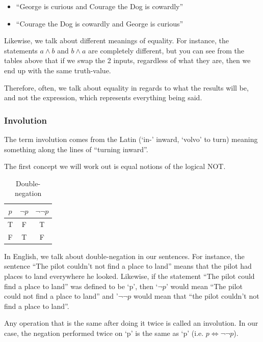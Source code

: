 \begin{itemize}
    \item ``George is curious and Courage the Dog is cowardly''
    \item ``Courage the Dog is cowardly and George is curious''
\end{itemize}

Likewise, we talk about different meanings of equality. For instance, the statements $a \wedge b$ and $b \wedge a$ are completely different, but you can see from the tables above that if we swap the 2 inputs, regardless of what they are, then we end up with the same truth-value.

Therefore, often, we talk about equality in regards to what the results will be, and not the expression, which represents everything being said.

\subsubsection{Involution}
The term involution comes from the Latin (`in-' inward, `volvo' to turn) meaning something along the lines of ``turning inward''. 

The first concept we will work out is equal notions of the logical NOT.

\begin{table}[]
    \centering
    \begin{tabular}{|c|c|c|} \hline
         $p$ & $\neg p$ & $\neg \neg p$ \\ \hline
         T & F & T \\ \hline
         F & T & F \\ \hline
    \end{tabular}
    \caption{Double-negation}
    \label{tab:my_label}
\end{table}

In English, we talk about double-negation in our sentences. For instance, the sentence ``The pilot couldn't not find a place to land'' means that the pilot had places to land everywhere he looked. Likewise, if the statement ``The pilot could find a place to land'' was defined to be `p', then `$\neg p$' would mean ``The pilot could not find a place to land'' and '$\neg \neg p$ would mean that ``the pilot couldn't not find a place to land''.

Any operation that is the same after doing it twice is called an \gls{involution}. In our case, the negation performed twice on `p' is the same as `p' (i.e. $p\iff \neg \neg p$).

